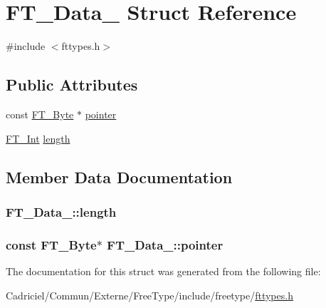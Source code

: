 \hypertarget{struct_f_t___data__}{\section{F\-T\-\_\-\-Data\-\_\- Struct Reference}
\label{struct_f_t___data__}
}


{\ttfamily \#include $<$fttypes.\-h$>$}

\subsection*{Public Attributes}
\begin{DoxyCompactItemize}
\item 
const \hyperlink{fttypes_8h_a51f26183ca0c9f4af958939648caeccd}{F\-T\-\_\-\-Byte} $\ast$ \hyperlink{struct_f_t___data___a4dea731b8a256b973757e1b8f612b050}{pointer}
\item 
\hyperlink{fttypes_8h_af90e5fb0d07e21be9fe6faa33f02484c}{F\-T\-\_\-\-Int} \hyperlink{struct_f_t___data___af60c89dccd1852aceb0dc08675aca2fd}{length}
\end{DoxyCompactItemize}


\subsection{Member Data Documentation}
\hypertarget{struct_f_t___data___af60c89dccd1852aceb0dc08675aca2fd}{
\subsubsection[{length}]{ F\-T\-\_\-\-Data\-\_\-\-::length}}\label{struct_f_t___data___af60c89dccd1852aceb0dc08675aca2fd}
\hypertarget{struct_f_t___data___a4dea731b8a256b973757e1b8f612b050}{
\subsubsection[{pointer}]{\setlength{\rightskip}{0pt plus 5cm}const {\bf F\-T\-\_\-\-Byte}$\ast$ F\-T\-\_\-\-Data\-\_\-\-::pointer}}\label{struct_f_t___data___a4dea731b8a256b973757e1b8f612b050}


The documentation for this struct was generated from the following file\-:\begin{DoxyCompactItemize}
\item 
Cadriciel/\-Commun/\-Externe/\-Free\-Type/include/freetype/\hyperlink{fttypes_8h}{fttypes.\-h}\end{DoxyCompactItemize}
